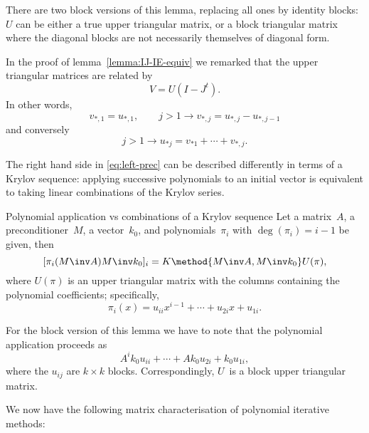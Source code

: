 \begin{block}
There are two block versions of this lemma,
replacing all ones by identity blocks: $U$ can be either a true upper
triangular matrix, or a block triangular matrix where the diagonal
blocks are not necessarily themselves of diagonal form.
\end{block}

\begin{remark}
  \label{rem:IJ-IE-upper}
  In the proof of lemma~\ref{lemma:IJ-IE-equiv} we remarked that
  the upper triangular matrices are related by
  \[ V=U(I-J^t). \]
  In other words,
  \[ v_{*,1}=u_{*,1},\qquad j>1\rightarrow v_{*,j}=u_{*,j}-u_{*,j-1} \]
  and conversely
  \[ j>1\rightarrow u_{*j} = v_{*1}+\cdots+v_{*,j}. \]
\end{remark}

The right hand side in \eqref{eq:left-prec} can be described
differently in terms of a Krylov sequence: 
applying successive polynomials to an initial vector
is equivalent to taking linear combinations of the Krylov series.

\begin{precond}
\begin{llemma}{Polynomial application vs combinations of a Krylov sequence}
\label{lemma:Poly-U}\label{th:polynomial}
Let a matrix~$A$, a preconditioner~$M$, a vector~$k_0$, and
polynomials~$\pi_i$ with $\deg(\pi_i)=i-1$ be given, then
\[ [\pi_i(M\inv A)M\inv k_0]_i=K\method{M\inv A,M\inv k_0}U(\pi), \]
where $U(\pi)$ is an upper triangular matrix with the columns 
containing the polynomial coefficients; specifically, 
        \[ \pi_i(x)=u_{ii}x^{i-1}+\cdots+u_{2i}x+u_{1i}. \]
\end{llemma}
\end{precond}

\begin{block}
For the block version of this lemma we have to note that the polynomial
application proceeds as
\[ A^ik_0u_{ii}+\cdots +Ak_0u_{2i}+k_0u_{1i}, \]
where the $u_{ij}$ are $k\times k$ blocks. Correspondingly, $U$~is
a block upper triangular matrix.
\end{block}

We now have the following matrix characterisation of polynomial iterative
methods:

